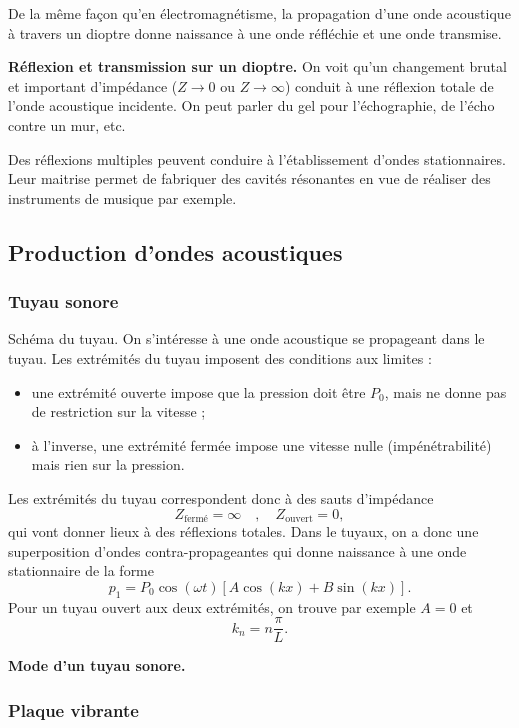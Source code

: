De la même façon qu'en électromagnétisme, la propagation d'une onde acoustique à travers un dioptre donne naissance à une onde réfléchie et une onde transmise.
\begin{slide}
\textbf{Réflexion et transmission sur un dioptre.}
On voit qu'un changement brutal et important d'impédance ($Z\rightarrow 0$ ou $Z\rightarrow \infty$) conduit à une réflexion totale de l'onde acoustique incidente.
On peut parler du gel pour l'échographie, de l'écho contre un mur, etc.
\end{slide}

\begin{transition}
Des réflexions multiples peuvent conduire à l'établissement d'ondes stationnaires.
Leur maitrise permet de fabriquer des cavités résonantes en vue de réaliser des instruments de musique par exemple.
\end{transition}

\subsection{Production d'ondes acoustiques}

\subsubsection{Tuyau sonore}

Schéma du tuyau.
On s'intéresse à une onde acoustique se propageant dans le tuyau.
Les extrémités du tuyau imposent des conditions aux limites :
\begin{itemize}
\item une extrémité ouverte impose que la pression doit être $P_0$, mais ne donne pas de restriction sur la vitesse ;
\item à l'inverse, une extrémité fermée impose une vitesse nulle (impénétrabilité) mais rien sur la pression.
\end{itemize}
Les extrémités du tuyau correspondent donc à des sauts d'impédance
\begin{equation}
Z_\mathrm{fermé} = \infty \quad , \quad Z_\mathrm{ouvert} = 0,
\end{equation}
qui vont donner lieux à des réflexions totales.
Dans le tuyaux, on a donc une superposition d'ondes contra-propageantes qui donne naissance à une onde stationnaire de la forme
\begin{equation}
p_1 = P_0 \cos(\omega t) \left[ A\cos(kx) + B\sin(kx) \right].
\end{equation}
Pour un tuyau ouvert aux deux extrémités, on trouve par exemple $A=0$ et
\begin{equation}
k_n = n\frac{\pi}{L}.
\end{equation}
\begin{slide}
\textbf{Mode d'un tuyau sonore.}
\end{slide}


\subsubsection{Plaque vibrante}


\newpage
